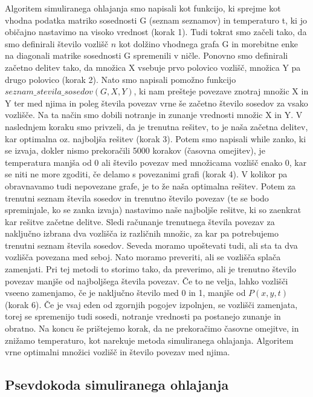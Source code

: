 \documentclass[12pt,a4paper]{amsart}
\theoremstyle{definition} %
\theoremstyle{plain} %
\begin{document}
Algoritem simuliranega ohlajanja smo napisali kot funkcijo, ki sprejme kot vhodna podatka matriko sosednosti G (seznam seznamov) in temperaturo t, ki jo običajno nastavimo na visoko vrednost (korak 1). Tudi tokrat smo začeli tako, da smo definirali število vozlišč $n$ kot dolžino vhodnega grafa G in morebitne enke na diagonali matrike sosednosti G spremenili v ničle. Ponovno smo definirali začetno delitev tako, da množica X vsebuje prvo polovico vozlišč, množica Y pa drugo polovico (korak 2). Nato smo napisali pomožno funkcijo $seznam\_stevila\_sosedov(G,X,Y)$, ki nam prešteje povezave znotraj množic X in Y ter med njima in poleg števila povezav vrne še začetno število sosedov za vsako vozlišče. Na ta način smo dobili notranje in zunanje vrednosti množic X in Y. V naslednjem koraku smo privzeli, da je trenutna rešitev, to je naša začetna delitev, kar optimalna oz. najboljša rešitev (korak 3). Potem  smo napisali while zanko, ki se izvaja, dokler nismo prekoračili 5000 korakov (časovna omejitev), je temperatura manjša od 0 ali število povezav med množicama vozlišč enako 0, kar se niti ne more zgoditi, če delamo s povezanimi grafi (korak 4). V kolikor pa obravnavamo tudi nepovezane grafe, je to že naša optimalna rešitev. Potem za trenutni seznam števila sosedov in trenutno število povezav (te se bodo spreminjale, ko se zanka izvaja) nastavimo naše najboljše rešitve, ki so zaenkrat kar rešitve začetne delitve. Sledi računanje trenutnega števila povezav za naključno izbrana dva vozlišča iz različnih množic, za kar pa potrebujemo trenutni seznam števila sosedov. Seveda moramo upoštevati tudi, ali sta ta dva vozlišča povezana med seboj. Nato moramo preveriti, ali se vozlišča splača zamenjati. Pri tej metodi to storimo tako, da preverimo, ali je trenutno število povezav manjše od najboljšega števila povezav. Če to ne velja, lahko vozlišči vseeno zamenjamo, če je naključno število med 0 in 1, manjše od $P(x,y,t)$ (korak 6). Če je vsaj eden od zgornjih pogojev izpolnjen, se vozlišči zamenjata, torej se spremenijo tudi sosedi, notranje vrednosti pa postanejo zunanje in obratno. Na koncu še prištejemo korak, da ne prekoračimo časovne omejitve, in znižamo temperaturo, kot narekuje metoda simuliranega ohlajanja. Algoritem vrne optimalni množici vozlišč in število povezav med njima.

\newpage

\subsection{Psevdokoda simuliranega ohlajanja}
\end{document}
